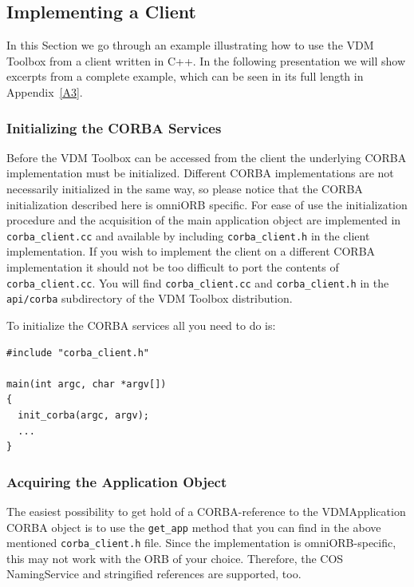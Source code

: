 \documentclass[\pformat,12pt]{article}
\begin{document}
\subsection{Implementing a Client}

In this Section we go through an example illustrating how to use the
VDM Toolbox from a client written in C++. In the following
presentation we will show excerpts from a complete example, which can
be seen in its full length in Appendix~\ref{A3}.  

\subsubsection{Initializing the CORBA Services}

Before the VDM Toolbox can be accessed from the client the underlying
CORBA implementation must be initialized. Different CORBA
implementations are not necessarily initialized in the same way, so
please notice that the CORBA initialization described here is omniORB
specific. For ease of use the initialization procedure and the
acquisition of the main application object are implemented in {\tt
  corba\_client.cc} and available by including {\tt corba\_client.h}
in the client implementation. If you wish to implement the client on a
different CORBA implementation it should not be too difficult to port
the contents of {\tt corba\_client.cc}. You will find
\texttt{corba\_client.cc} and \texttt{corba\_client.h} in the
\texttt{api/corba} subdirectory of the VDM Toolbox distribution.

To initialize the CORBA services all you need to do is:

\begin{verbatim}
#include "corba_client.h"

main(int argc, char *argv[])
{
  init_corba(argc, argv);
  ...
}
\end{verbatim}

\subsubsection{Acquiring the Application Object}

The easiest possibility to get hold of a CORBA-reference to
the VDMApplication CORBA object is to use the {\tt get\_app} method
that you can find in the above mentioned \texttt{corba\_client.h} 
file. Since the implementation is omniORB-specific, this may
not work with the ORB of your choice. Therefore, the COS NamingService
and stringified references are supported, too.
\end{document}
